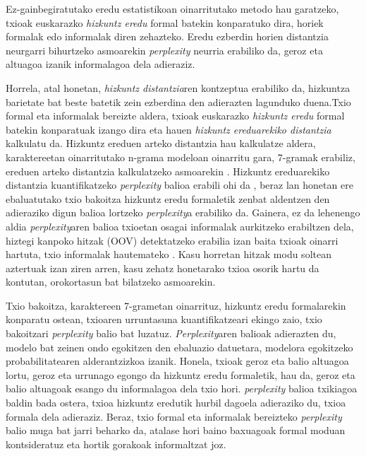 \documentclass[information,article,submit,moreauthors,pdftex,10pt,a4paper]{Definitions/mdpi}
\begin{document}
Ez-gainbegiratutako eredu estatistikoan oinarritutako metodo hau garatzeko, txioak euskarazko \textit{hizkuntz eredu} formal batekin konparatuko dira, horiek formalak edo informalak diren zehazteko. Eredu ezberdin horien distantzia neurgarri bihurtzeko asmoarekin \textit{perplexity} neurria erabiliko da, geroz eta altuagoa izanik informalagoa dela adieraziz.

Horrela, atal honetan, \textit{hizkuntz distantzia}ren kontzeptua erabiliko da, hizkuntza barietate bat beste batetik zein ezberdina den adierazten lagunduko duena.Txio formal eta informalak bereizte aldera, txioak euskarazko \textit{hizkuntz eredu} formal batekin konparatuak izango dira eta hauen \textit{hizkuntz ereduarekiko distantzia} kalkulatu da. Hizkuntz ereduen arteko distantzia hau kalkulatze aldera, karaktereetan oinarritutako n-grama modeloan oinarritu gara, 7-gramak erabiliz, ereduen arteko distantzia kalkulatzeko asmoarekin \citep{gamallo2017language}. Hizkuntz ereduarekiko distantzia kuantifikatzeko \textit{perplexity} balioa erabili ohi da \citep{chen1999empirical}, beraz lan honetan ere ebaluatutako txio bakoitza hizkuntz eredu formaletik zenbat aldentzen den adieraziko digun balioa lortzeko \textit{perplexity}a erabiliko da. Gainera, ez da lehenengo aldia \textit{perplexity}aren balioa txioetan osagai informalak aurkitzeko erabiltzen dela, hiztegi kanpoko hitzak (OOV) detektatzeko erabilia izan baita txioak oinarri hartuta, txio informalak hautemateko \citep{gonzalez2015analysis}. Kasu horretan hitzak modu soltean aztertuak izan ziren arren, kasu zehatz honetarako txioa osorik hartu da kontutan, orokortasun bat bilatzeko asmoarekin.


Txio bakoitza, karaktereen 7-grametan oinarrituz, hizkuntz eredu formalarekin konparatu ostean, txioaren urruntasuna kuantifikatzeari ekingo zaio, txio bakoitzari \textit{perplexity} balio bat luzatuz. \textit{Perplexity}aren balioak adierazten du, modelo bat zeinen ondo egokitzen den ebaluazio datuetara, modelora egokitzeko probabilitatearen alderantzizkoa izanik. Honela, txioak geroz eta balio altuagoa lortu, geroz eta urrunago egongo da hizkuntz eredu formaletik, hau da, geroz eta balio altuagoak esango du informalagoa dela txio hori. \textit{perplexity} balioa txikiagoa baldin bada ostera, txioa hizkuntz eredutik hurbil dagoela adieraziko du, txioa formala dela adieraziz. Beraz, txio formal eta informalak bereizteko \textit{perplexity} balio muga bat jarri beharko da, atalase hori baino baxuagoak formal moduan kontsideratuz eta hortik gorakoak informaltzat joz.
\end{document}
